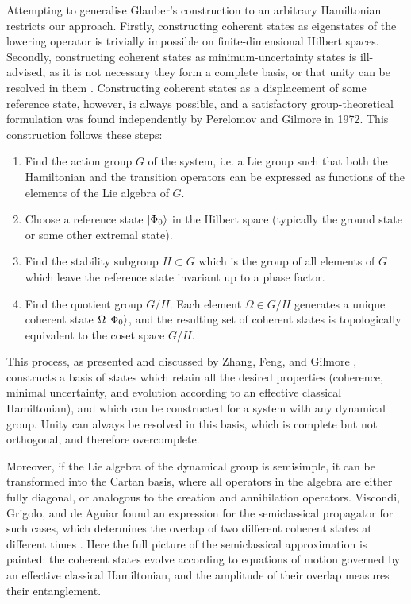 \documentclass[12pt]{article}
\begin{document}
	Attempting to generalise Glauber's construction to an arbitrary Hamiltonian restricts our approach. Firstly, constructing coherent states as eigenstates of the lowering operator is trivially impossible on finite-dimensional Hilbert spaces. Secondly, constructing coherent states as minimum-uncertainty states is ill-advised, as it is not necessary they form a complete basis, or that unity can be resolved in them \cite{no_unity}. Constructing coherent states as a displacement of some reference state, however, is always possible, and a satisfactory group-theoretical formulation was found independently by Perelomov \cite{perelomov_og} and Gilmore \cite{gilmore_og} in 1972. This construction follows these steps:
	\begin{enumerate}
		\item Find the action group $G$ of the system, i.e. a Lie group such that both the Hamiltonian and the transition operators can be expressed as functions of the elements of the Lie algebra of $G$.
		\item Choose a reference state $\ket{\Phi_0}$ in the Hilbert space (typically the ground state or some other extremal state).
		\item Find the stability subgroup $H\subset G$ which is the group of all elements of $G$ which leave the reference state invariant up to a phase factor.
		\item Find the quotient group $G/H$. Each element $\Omega\in G/H$ generates a unique coherent state $\Omega\ket{\Phi_0}$, and the resulting set of coherent states is topologically equivalent to the coset space $G/H$.
	\end{enumerate}
	This process, as presented and discussed by Zhang, Feng, and Gilmore \cite{ZFG}, constructs a basis of states which retain all the desired properties (coherence, minimal uncertainty, and evolution according to an effective classical Hamiltonian), and which can be constructed for a system with any dynamical group. Unity can always be resolved in this basis, which is complete but not orthogonal, and therefore overcomplete.
	
	Moreover, if the Lie algebra of the dynamical group is semisimple, it can be transformed into the Cartan basis, where all operators in the algebra are either fully diagonal, or analogous to the creation and annihilation operators. Viscondi, Grigolo, and de Aguiar found an expression for the semiclassical propagator for such cases, which determines the overlap of two different coherent states at different times \cite{Aguiar}. Here the full picture of the semiclassical approximation is painted: the coherent states evolve according to equations of motion governed by an effective classical Hamiltonian, and the amplitude of their overlap measures their entanglement.
	
\end{document}
